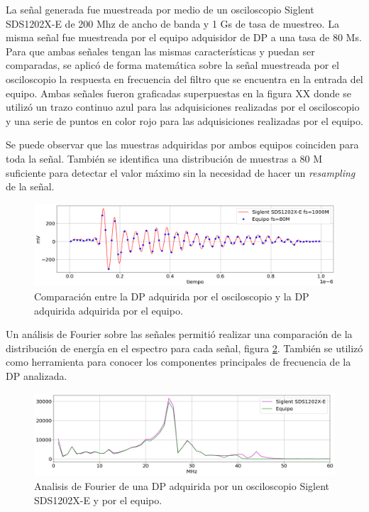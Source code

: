 \vspace{5mm}

La señal generada fue muestreada por medio de un osciloscopio Siglent SDS1202X-E de 200 Mhz de ancho de banda y 1 Gs de tasa de muestreo. La misma señal fue muestreada por el equipo adquisidor de DP a una tasa de 80 Ms. Para que ambas señales tengan las mismas características y puedan ser comparadas, se aplicó de forma matemática sobre la señal muestreada por el osciloscopio la respuesta en frecuencia del filtro que se encuentra en la entrada del equipo. Ambas señales fueron graficadas superpuestas en la figura XX donde se utilizó un trazo continuo azul para las adquisiciones realizadas por el osciloscopio y una serie de puntos en color rojo para las adquisiciones realizadas por el equipo.

Se puede observar que las muestras adquiridas por ambos equipos coinciden para toda la señal. También se identifica una distribución de muestras a 80 M suficiente para detectar el valor máximo sin la necesidad de hacer un \textit{resampling} de la señal.


\vspace{10mm}

\begin{figure}[ht]
	\centering
	\includegraphics[width=135mm]{./Figures/compPulsos.png}
	\caption{Comparación entre la DP adquirida por el osciloscopio y la DP adquirida adquirida por el equipo.}
	\label{fig:compPulsos}
\end{figure}

\vspace{10mm}

Un análisis de Fourier sobre las señales permitió realizar una comparación de la distribución de energía en el espectro para cada señal, figura \ref{fig:compEspectro}. También se utilizó como herramienta para conocer los componentes principales de frecuencia de la DP analizada.

\begin{figure}[ht]
	\centering
	\includegraphics[width=135mm]{./Figures/compEspectro.png}
	\caption{Analisis de Fourier de una DP adquirida por un osciloscopio Siglent SDS1202X-E y  por el equipo.}
	\label{fig:compEspectro}
\end{figure}


